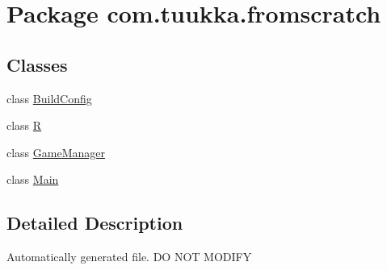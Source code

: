 \hypertarget{namespacecom_1_1tuukka_1_1fromscratch}{\section{Package com.\-tuukka.\-fromscratch}
\label{namespacecom_1_1tuukka_1_1fromscratch}
}
\subsection*{Classes}
\begin{DoxyCompactItemize}
\item 
class \hyperlink{classcom_1_1tuukka_1_1fromscratch_1_1BuildConfig}{Build\-Config}
\item 
class \hyperlink{classcom_1_1tuukka_1_1fromscratch_1_1R}{R}
\item 
class \hyperlink{classcom_1_1tuukka_1_1fromscratch_1_1GameManager}{Game\-Manager}
\item 
class \hyperlink{classcom_1_1tuukka_1_1fromscratch_1_1Main}{Main}
\end{DoxyCompactItemize}


\subsection{Detailed Description}
Automatically generated file. D\-O N\-O\-T M\-O\-D\-I\-F\-Y 